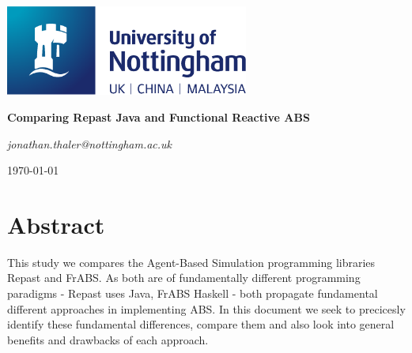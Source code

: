 \documentclass[oneside]{book}
\begin{document}
\begin{titlepage}
	\centering
	\includegraphics[width=0.60\textwidth]{../../logo/UoN_Primary_Logo_RGB.png}\par\vspace{1cm}
	\vspace{1.5cm}
	{\huge\bfseries Comparing Repast Java and Functional Reactive ABS \par}
	\vspace{2cm}
	{\Large\itshape jonathan.thaler@nottingham.ac.uk \par}
	\vfill
	
	\vfill

	{\large \today\par}
\end{titlepage}

\cleardoublepage

\section*{Abstract}
This study we compares the Agent-Based Simulation programming libraries Repast and FrABS. As both are of fundamentally different programming paradigms - Repast uses Java, FrABS Haskell - both propagate fundamental different approaches in implementing ABS. In this document we seek to precicesly identify these fundamental differences, compare them and also look into general benefits and drawbacks of each approach.

\clearpage
\tableofcontents
\clearpage















\renewcommand\bibname{References}



\end{document}
